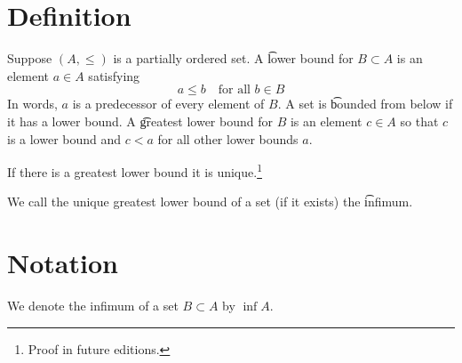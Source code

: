 
\section*{Definition}

Suppose $(A, \leq)$ is a partially ordered set.
A \t{lower bound} for $B \subset A$ is an element $a \in A$ satisfying
\[
a \leq b \quad \text{for all } b \in B
\]
In words, $a$ is a predecessor of every element of $B$.
A set is \t{bounded from below} if it has a lower bound.
A \t{greatest lower bound} for $B$ is an element $c \in A$ so that $c$ is a lower bound and $c < a$ for all other lower bounds $a$.

\begin{proposition}
If there is a greatest lower bound it is unique.\footnote{Proof in future editions.}
\end{proposition}

We call the unique greatest lower bound of a set (if it exists) the \t{infimum}.

\section*{Notation}

We denote the infimum of a set $B \subset A$ by $\inf A$.

\blankpage